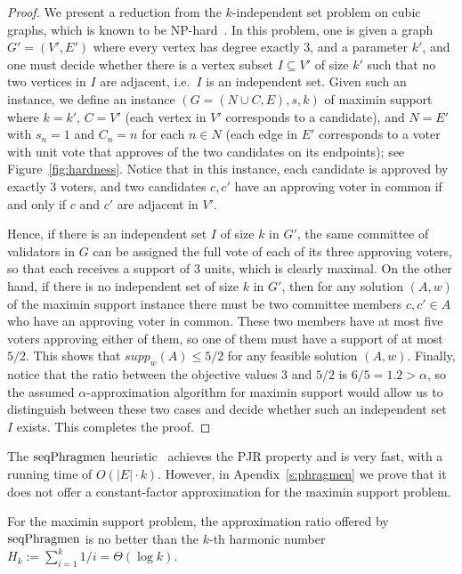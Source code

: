 \begin{proof}
We present a reduction from the $k$-independent set problem on cubic graphs, which is known to be NP-hard~\cite{johnson1979computers}. In this problem, one is given a graph $G'=(V',E')$ where every vertex has degree exactly 3, and a parameter $k'$, and one must decide whether there is a vertex subset $I\subseteq V'$ of size $k'$ such that no two vertices in $I$ are adjacent, i.e.~$I$ is an independent set. 
Given such an instance, we define an instance $(G=(N\cup C, E), s, k)$ of maximin support where $k=k'$, $C=V'$ (each vertex in $V'$ corresponds to a candidate), and $N=E'$ with $s_n=1$ and $C_n=n$ for each $n\in N$ (each edge in $E'$ corresponds to a voter with unit vote that approves of the two candidates on its endpoints); see Figure~\ref{fig:hardness}.
Notice that in this instance, each candidate is approved by exactly 3 voters, and two candidates $c, c'$ have an approving voter in common if and only if $c$ and $c'$ are adjacent in $V'$.

Hence, if there is an independent set $I$ of size $k$ in $G'$, the same committee of validators in $G$ can be assigned the full vote of each of its three approving voters, so that each receives a support of 3 units, which is clearly maximal. On the other hand, if there is no independent set of size $k$ in $G'$, then for any solution $(A,w)$ of the maximin support instance there must be two committee members $c,c'\in A$ who have an approving voter in common. These two members have at most five voters approving either of them, so one of them must have a support of at most $5/2$. This shows that $supp_w(A)\leq 5/2$ for any feasible solution $(A,w)$. Finally, notice that the ratio between the objective values $3$ and $5/2$ is $6/5=1.2>\alpha$, so the assumed $\alpha$-approximation algorithm for maximin support would allow us to distinguish between these two cases and decide whether such an independent set $I$ exists. This completes the proof.
\end{proof}

The $\operatorname{seqPhragmen}$ heuristic~\cite{brill2017phragmen} achieves the PJR property and is very fast, with a running time of $O(|E|\cdot k)$. However, in Apendix~\ref{s:phragmen} we prove that it does not offer a constant-factor approximation for the maximin support problem. 

\begin{lemma}\label{lem:phragmen}
For the maximin support problem, the approximation ratio offered by $\operatorname{seqPhragmen}$ is no better than the $k$-th harmonic number $H_k:=\sum_{i=1}^k 1/i = \Theta(\log k)$.
\end{lemma}


